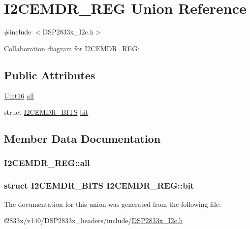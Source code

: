 \hypertarget{union_i2_c_e_m_d_r___r_e_g}{}\section{I2\+C\+E\+M\+D\+R\+\_\+\+R\+E\+G Union Reference}
\label{union_i2_c_e_m_d_r___r_e_g}


{\ttfamily \#include $<$D\+S\+P2833x\+\_\+\+I2c.\+h$>$}



Collaboration diagram for I2\+C\+E\+M\+D\+R\+\_\+\+R\+E\+G\+:
\subsection*{Public Attributes}
\begin{DoxyCompactItemize}
\item 
\hyperlink{_d_s_p2833x___device_8h_a59a9f6be4562c327cbfb4f7e8e18f08b}{Uint16} \hyperlink{union_i2_c_e_m_d_r___r_e_g_a28183ec190cbef9884e95e0b00bb3e9a}{all}
\item 
struct \hyperlink{struct_i2_c_e_m_d_r___b_i_t_s}{I2\+C\+E\+M\+D\+R\+\_\+\+B\+I\+T\+S} \hyperlink{union_i2_c_e_m_d_r___r_e_g_a4a6e0a46cbb9241ae799dc77dcc75aad}{bit}
\end{DoxyCompactItemize}


\subsection{Member Data Documentation}
\hypertarget{union_i2_c_e_m_d_r___r_e_g_a28183ec190cbef9884e95e0b00bb3e9a}{}
\subsubsection[{all}]{ I2\+C\+E\+M\+D\+R\+\_\+\+R\+E\+G\+::all}\label{union_i2_c_e_m_d_r___r_e_g_a28183ec190cbef9884e95e0b00bb3e9a}
\hypertarget{union_i2_c_e_m_d_r___r_e_g_a4a6e0a46cbb9241ae799dc77dcc75aad}{}
\subsubsection[{bit}]{\setlength{\rightskip}{0pt plus 5cm}struct {\bf I2\+C\+E\+M\+D\+R\+\_\+\+B\+I\+T\+S} I2\+C\+E\+M\+D\+R\+\_\+\+R\+E\+G\+::bit}\label{union_i2_c_e_m_d_r___r_e_g_a4a6e0a46cbb9241ae799dc77dcc75aad}


The documentation for this union was generated from the following file\+:\begin{DoxyCompactItemize}
\item 
f2833x/v140/\+D\+S\+P2833x\+\_\+headers/include/\hyperlink{_d_s_p2833x___i2c_8h}{D\+S\+P2833x\+\_\+\+I2c.\+h}\end{DoxyCompactItemize}
